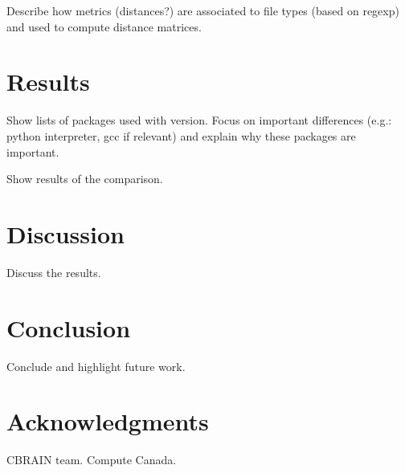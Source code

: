 \documentclass{article}
\begin{document}
Describe how metrics (distances?) are associated to file types (based on regexp) and used to compute distance matrices.


\section{Results}

Show lists of packages used with version. Focus on important
differences (e.g.: python interpreter, gcc if relevant) and explain
why these packages are important.

Show results of the comparison.

\section{Discussion}

Discuss the results.

\section{Conclusion}

Conclude and highlight future work.

\section{Acknowledgments}

CBRAIN team. Compute Canada.



\end{document}
